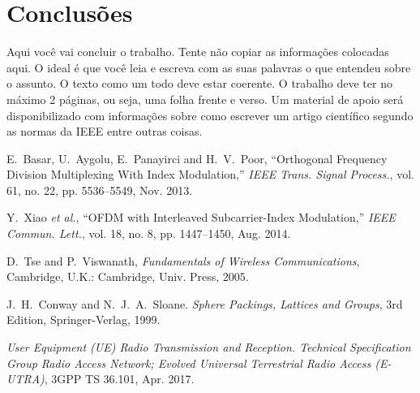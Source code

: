 \documentclass{sbrt2018port}
\begin{document}
\section{Conclusões}
\label{s_concl}

Aqui você vai concluir o trabalho. Tente não copiar as informações colocadas aqui. O ideal é que você leia e escreva com as suas palavras o que entendeu sobre o assunto. O texto como um todo deve estar coerente. O trabalho deve ter no máximo 2 páginas, ou seja, uma folha frente e verso. Um material de apoio será disponibilizado com informações sobre como escrever um artigo científico segundo as normas da IEEE entre outras coisas.


\begin{thebibliography}{99}
E.~Basar, U.~Aygolu, E.~Panayirci and H.~V.~Poor, ``Orthogonal Frequency Division Multiplexing With Index Modulation,'' \emph{IEEE Trans. Signal Process.}, vol. 61, no. 22, pp. 5536--5549, Nov. 2013.

Y.~Xiao \emph{et al.}, ``OFDM with Interleaved Subcarrier-Index Modulation,'' \emph{IEEE Commun. Lett.}, vol. 18, no. 8, pp. 1447--1450, Aug. 2014.


D.~Tse and P.~Viswanath, \emph{Fundamentals of Wireless Communications}, Cambridge, U.K.: Cambridge, Univ. Press, 2005.

J.~H.~Conway and N.~J.~A.~Sloane. \emph{Sphere Packings, Lattices and Groups}, 3rd Edition, Springer-Verlag, 1999.

\emph{User Equipment ({UE}) Radio Transmission and Reception. Technical Specification Group Radio Access Network; Evolved Universal Terrestrial \hspace*{0.55cm} 
Radio Access ({E-UTRA})}, 3GPP TS 36.101, Apr. 2017. 

\end{thebibliography}
\end{document}
